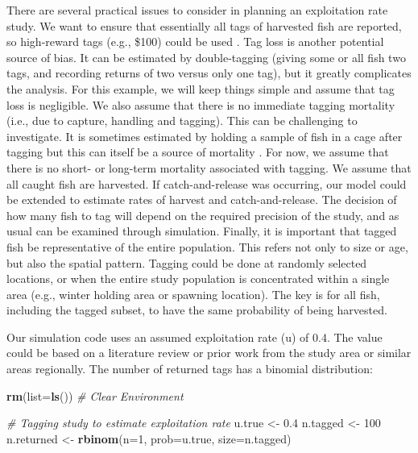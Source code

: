 \documentclass[
]{krantz}
\makeatletter
\newenvironment{Shaded}{\begin{snugshade}}{\end{snugshade}}
\newcommand{\AttributeTok}[1]{\textcolor[rgb]{0.27,0.27,0.27}{#1}}
\newcommand{\CommentTok}[1]{\textcolor[rgb]{0.37,0.37,0.37}{\textit{#1}}}
\newcommand{\DecValTok}[1]{\textcolor[rgb]{0.06,0.06,0.06}{#1}}
\newcommand{\FloatTok}[1]{\textcolor[rgb]{0.06,0.06,0.06}{#1}}
\newcommand{\FunctionTok}[1]{\textcolor[rgb]{0.27,0.27,0.27}{\textbf{#1}}}
\newcommand{\NormalTok}[1]{#1}
\newcommand{\OtherTok}[1]{\textcolor[rgb]{0.37,0.37,0.37}{#1}}
\newenvironment{kframe}{%
\medskip{}
\setlength{\fboxsep}{.8em}
 \def\at@end@of@kframe{}%
 \ifinner\ifhmode%
  \def\at@end@of@kframe{\end{minipage}}%
  \begin{minipage}{\columnwidth}%
 \fi\fi%
 \def\FrameCommand##1{\hskip\@totalleftmargin \hskip-\fboxsep
 \colorbox{shadecolor}{##1}\hskip-\fboxsep
     \hskip-\linewidth \hskip-\@totalleftmargin \hskip\columnwidth}%
 \MakeFramed {\advance\hsize-\width
   \@totalleftmargin\z@ \linewidth\hsize
   \@setminipage}}%
 {\par\unskip\endMakeFramed%
 \at@end@of@kframe}
\renewenvironment{Shaded}{\begin{kframe}}{\end{kframe}}
\makeatother
\begin{document}
There are several practical issues to consider in planning an exploitation rate study. We want to ensure that essentially all tags of harvested fish are reported, so high-reward tags (e.g., \$100) could be used \citep{pollock.etal_2001}. Tag loss is another potential source of bias. It can be estimated by double-tagging (giving some or all fish two tags, and recording returns of two versus only one tag), but it greatly complicates the analysis. For this example, we will keep things simple and assume that tag loss is negligible. We also assume that there is no immediate tagging mortality (i.e., due to capture, handling and tagging). This can be challenging to investigate. It is sometimes estimated by holding a sample of fish in a cage after tagging but this can itself be a source of mortality \citep{pollock.pine2007}. For now, we assume that there is no short- or long-term mortality associated with tagging. We assume that all caught fish are harvested. If catch-and-release was occurring, our model could be extended to estimate rates of harvest and catch-and-release. The decision of how many fish to tag will depend on the required precision of the study, and as usual can be examined through simulation. Finally, it is important that tagged fish be representative of the entire population. This refers not only to size or age, but also the spatial pattern. Tagging could be done at randomly selected locations, or when the entire study population is concentrated within a single area (e.g., winter holding area or spawning location). The key is for all fish, including the tagged subset, to have the same probability of being harvested.

Our simulation code uses an assumed exploitation rate (u) of 0.4. The value could be based on a literature review or prior work from the study area or similar areas regionally. The number of returned tags has a binomial distribution:

\begin{Shaded}
\begin{Highlighting}[]
\FunctionTok{rm}\NormalTok{(}\AttributeTok{list=}\FunctionTok{ls}\NormalTok{()) }\CommentTok{\# Clear Environment}

\CommentTok{\# Tagging study to estimate exploitation rate}
\NormalTok{u.true }\OtherTok{\textless{}{-}} \FloatTok{0.4}
\NormalTok{n.tagged }\OtherTok{\textless{}{-}} \DecValTok{100}
\NormalTok{n.returned }\OtherTok{\textless{}{-}} \FunctionTok{rbinom}\NormalTok{(}\AttributeTok{n=}\DecValTok{1}\NormalTok{, }\AttributeTok{prob=}\NormalTok{u.true, }\AttributeTok{size=}\NormalTok{n.tagged)}
\end{Highlighting}
\end{Shaded}
\end{document}
